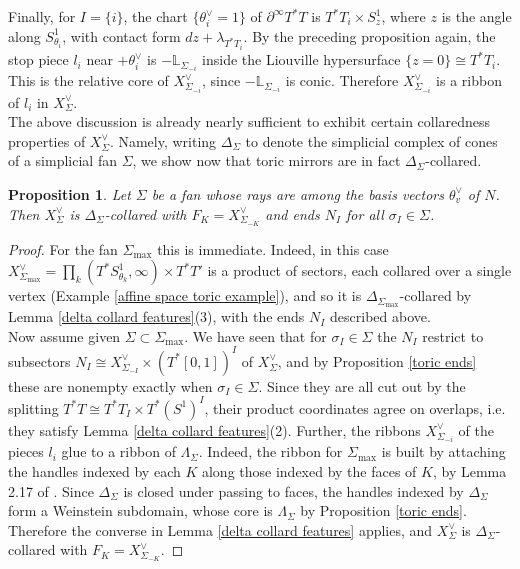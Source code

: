\documentclass[11pt]{amsart}
\newtheorem{prop}[thm]{Proposition}
\theoremstyle{definition}
\theoremstyle{remark}
\numberwithin{equation}{section}
\begin{document}
Finally, for $I=\{i\}$, the chart $\{\theta_i^\vee=1\}$ of $\partial^\infty T^*T$ is $T^*T_i\times S^1_z$, where $z$ is the angle along $S^1_{\theta_i}$, with contact form $dz+\lambda_{T^*T_i}$. By the preceding proposition again, the stop piece $l_i$ near $+\theta_i^\vee$ is $-\mathbb L_{\Sigma_{-i}}$ inside the Liouville hypersurface $\{z=0\}\cong T^*T_i$. This is the relative core of $X^\vee_{\Sigma_{-i}}$, since $-\mathbb L_{\Sigma_{-i}}$ is conic. Therefore $X^\vee_{\Sigma_{-i}}$ is a ribbon of $l_i$ in $X^\vee_{\Sigma}$.\\

The above discussion is already nearly sufficient to exhibit certain collaredness properties of $X^\vee_\Sigma$. Namely, writing $\Delta_\Sigma$ to denote the simplicial complex of cones of a simplicial fan $\Sigma$, we show now that toric mirrors are in fact $\Delta_\Sigma$-collared.

\begin{prop}\label{lem:toric-collared}
Let $\Sigma$ be a fan whose rays are among the basis vectors $\theta_v^\vee$ of $N$. Then $X^\vee_\Sigma$ is $\Delta_\Sigma$-collared with $F_K=X^\vee_{\Sigma_{-K}}$ and ends $N_I$ for all $\sigma_I \in \Sigma$.
\end{prop}
 
\begin{proof}
For the fan $\Sigma_{\max}$ this is immediate. Indeed, in this case $X^\vee_{\Sigma_{\max}}=\prod_k(T^*S^1_{\theta_k},\infty)\times T^*T'$ is a product of sectors, each collared over a single vertex (Example \ref{affine space toric example}), and so it is $\Delta_{\Sigma_{\max}}$-collared by Lemma \ref{delta collard features}(3), with the ends $N_I$ described above.\\

Now assume given $\Sigma\subset\Sigma_{\max}$. We have seen that for $\sigma_I\in\Sigma$ the $N_I$ restrict to subsectors $N_I\cong X^\vee_{\Sigma_{-I}}\times(T^*[0,1])^I$ of $X^\vee_\Sigma$, and by Proposition \ref{toric ends} these are nonempty exactly when $\sigma_I\in\Sigma$. Since they are all cut out by the splitting $T^*T\cong T^*T_I\times T^*(S^1)^I$, their product coordinates agree on overlaps, i.e. they satisfy Lemma \ref{delta collard features}(2). Further, the ribbons $X^\vee_{\Sigma_{-i}}$ of the pieces $l_i$ glue to a ribbon of $\Lambda_\Sigma$. Indeed, the ribbon for $\Sigma_{\max}$ is built by attaching the handles indexed by each $K$ along those indexed by the faces of $K$, by Lemma 2.17 of \cite{Asplund}. Since $\Delta_\Sigma$ is closed under passing to faces, the handles indexed by $\Delta_\Sigma$ form a Weinstein subdomain, whose core is $\Lambda_\Sigma$ by Proposition \ref{toric ends}. Therefore the converse in Lemma \ref{delta collard features} applies, and $X^\vee_\Sigma$ is $\Delta_\Sigma$-collared with $F_K=X^\vee_{\Sigma_{-K}}$.
\end{proof}
 
\end{document}
